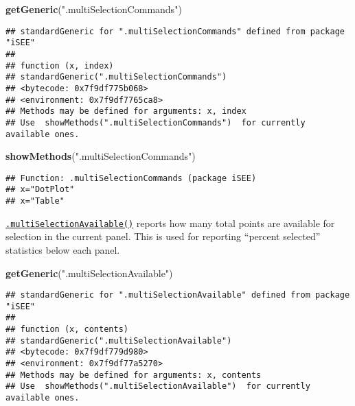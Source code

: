 \documentclass[
]{book}
\newenvironment{Shaded}{\begin{snugshade}}{\end{snugshade}}
\newcommand{\KeywordTok}[1]{\textcolor[rgb]{0.13,0.29,0.53}{\textbf{#1}}}
\newcommand{\NormalTok}[1]{#1}
\newcommand{\StringTok}[1]{\textcolor[rgb]{0.31,0.60,0.02}{#1}}
\begin{document}
\begin{Shaded}
\begin{Highlighting}[]
\KeywordTok{getGeneric}\NormalTok{(}\StringTok{".multiSelectionCommands"}\NormalTok{)}
\end{Highlighting}
\end{Shaded}

\begin{verbatim}
## standardGeneric for ".multiSelectionCommands" defined from package "iSEE"
## 
## function (x, index) 
## standardGeneric(".multiSelectionCommands")
## <bytecode: 0x7f9df775b068>
## <environment: 0x7f9df7765ca8>
## Methods may be defined for arguments: x, index
## Use  showMethods(".multiSelectionCommands")  for currently available ones.
\end{verbatim}

\begin{Shaded}
\begin{Highlighting}[]
\KeywordTok{showMethods}\NormalTok{(}\StringTok{".multiSelectionCommands"}\NormalTok{)}
\end{Highlighting}
\end{Shaded}

\begin{verbatim}
## Function: .multiSelectionCommands (package iSEE)
## x="DotPlot"
## x="Table"
\end{verbatim}

\href{https://isee.github.io/iSEE/reference/multi-select-generics.html}{\texttt{.multiSelectionAvailable()}} reports how many total points are available for selection in the current panel.
This is used for reporting ``percent selected'' statistics below each panel.

\begin{Shaded}
\begin{Highlighting}[]
\KeywordTok{getGeneric}\NormalTok{(}\StringTok{".multiSelectionAvailable"}\NormalTok{)}
\end{Highlighting}
\end{Shaded}

\begin{verbatim}
## standardGeneric for ".multiSelectionAvailable" defined from package "iSEE"
## 
## function (x, contents) 
## standardGeneric(".multiSelectionAvailable")
## <bytecode: 0x7f9df779d980>
## <environment: 0x7f9df77a5270>
## Methods may be defined for arguments: x, contents
## Use  showMethods(".multiSelectionAvailable")  for currently available ones.
\end{verbatim}
\end{document}
